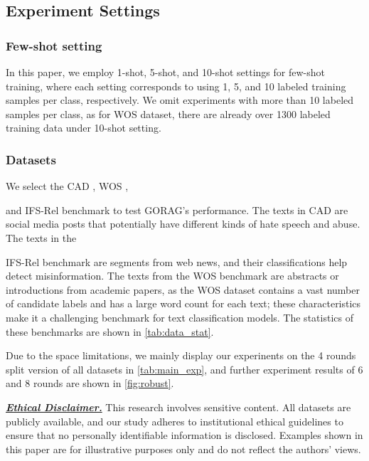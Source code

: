 \subsection{Experiment Settings}\label{ssec:exp:setting}
 
\subsubsection{\textbf{Few-shot setting}} 
In this paper, we employ 1-shot, 5-shot, and 10-shot settings for few-shot training, where each setting corresponds to using 1, 5, and 10 labeled training samples per class, respectively. 
We omit experiments with more than 10 labeled samples per class, as for WOS dataset, there are already over 1300 labeled training data under 10-shot setting. 
 
\subsubsection{\textbf{Datasets}}
We select the CAD \cite{vidgen2021introducing}, WOS \cite{kowsari2017hdltex}, 

and IFS-Rel \cite{xia-etal-2021-incremental} benchmark to test GORAG's performance. 
The texts in CAD are social media posts that potentially have different kinds of hate speech and abuse. 
The texts in the 

IFS-Rel benchmark are segments from web news, and their classifications help detect misinformation. 
The texts from the WOS benchmark are abstracts or introductions from academic papers, as the WOS dataset contains a vast number of candidate labels and has a large word count for each text; these characteristics make it a challenging benchmark for text classification models. The statistics of these benchmarks are shown in  \autoref{tab:data_stat}.


Due to the space limitations, we mainly display our experinents on the 4 rounds split version of all datasets in \autoref{tab:main_exp}, and further experiment results of 6 and 8 rounds are shown in \autoref{fig:robust}.


 



\noindent\underline{\textit{\textbf{Ethical Disclaimer.}}}
This research involves sensitive content. All datasets are publicly available, and our study adheres to institutional ethical guidelines to ensure that no personally identifiable information is disclosed. Examples shown in this paper are for illustrative purposes only and do not reflect the authors' views.
